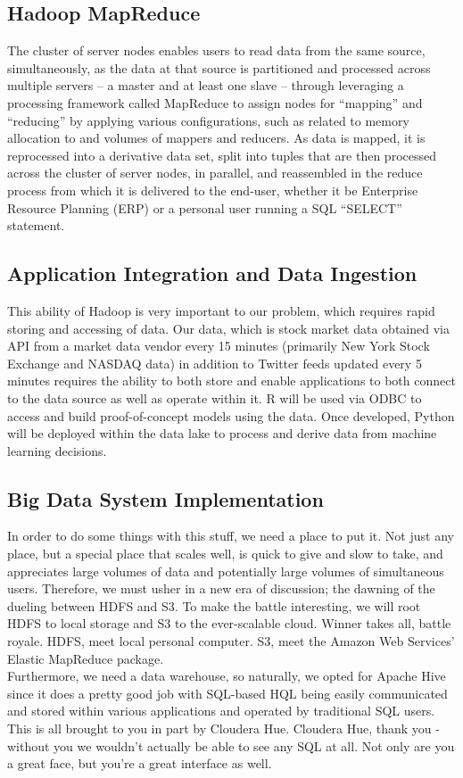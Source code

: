 \documentclass[journal]{IEEEtran}
\begin{document}
\subsection{Hadoop MapReduce}
The cluster of server nodes enables users to read data from the same source, simultaneously, as the data at that source is partitioned and processed across multiple servers – a master and at least one slave – through leveraging a processing framework called MapReduce to assign nodes for ``mapping'' and ``reducing'' by applying various configurations, such as related to memory allocation to and volumes of mappers and reducers. As data is mapped, it is reprocessed into a derivative data set, split into tuples that are then processed across the cluster of server nodes, in parallel, and reassembled in the reduce process from which it is delivered to the end-user, whether it be Enterprise Resource Planning (ERP) or a personal user running a SQL “SELECT” statement.
\\
\subsection{Application Integration and Data Ingestion}
This ability of Hadoop is very important to our problem, which requires rapid storing and accessing of data. Our data, which is stock market data obtained via API from a market data vendor every 15 minutes (primarily New York Stock Exchange and NASDAQ data) in addition to Twitter feeds updated every 5 minutes requires the ability to both store and enable applications to both connect to the data source as well as operate within it. R will be used via ODBC to access and build proof-of-concept models using the data. Once developed, Python will be deployed within the data lake to process and derive data from machine learning decisions.
\\
\subsection{Big Data System Implementation}
In order to do some things with this stuff, we need a place to put it. Not just any place, but a special place that scales well, is quick to give and slow to take, and appreciates large volumes of data and potentially large volumes of simultaneous users. Therefore, we must usher in a new era of discussion; the dawning of the dueling between HDFS and S3. To make the battle interesting, we will root HDFS to local storage and S3 to the ever-scalable cloud. Winner takes all, battle royale. HDFS, meet local personal computer. S3, meet the Amazon Web Services' Elastic MapReduce package.
\\
Furthermore, we need a data warehouse, so naturally, we opted for Apache Hive since it does a pretty good job with SQL-based HQL being easily communicated and stored within various applications and operated by traditional SQL users. This is all brought to you in part by Cloudera Hue. Cloudera Hue, thank you - without you we wouldn't actually be able to see any SQL at all. Not only are you a great face, but you're a great interface as well.
\\
\end{document}
